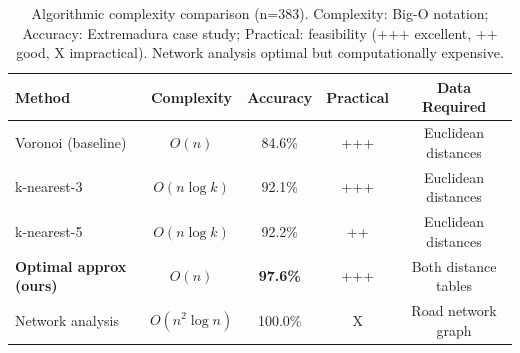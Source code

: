 \begin{table}[htbp]
\caption{Algorithmic complexity comparison (n=383). Complexity: Big-O notation; Accuracy: Extremadura case study; Practical: feasibility (+++ excellent, ++ good, X impractical). Network analysis optimal but computationally expensive.}
\label{tab:algorithmic_complexity}
\centering
\begin{tabular}{lcccc}
\toprule
Method & Complexity & Accuracy & Practical & Data Required \\
\midrule
Voronoi (baseline) & $O(n)$ & 84.6\% & +++ & Euclidean distances \\
k-nearest-3 & $O(n \log k)$ & 92.1\% & +++ & Euclidean distances \\
k-nearest-5 & $O(n \log k)$ & 92.2\% & ++ & Euclidean distances \\
\textbf{Optimal approx (ours)} & $O(n)$ & \textbf{97.6\%} & +++ & Both distance tables \\
Network analysis & $O(n^2 \log n)$ & 100.0\% & X & Road network graph \\
\bottomrule
\end{tabular}
\end{table}
